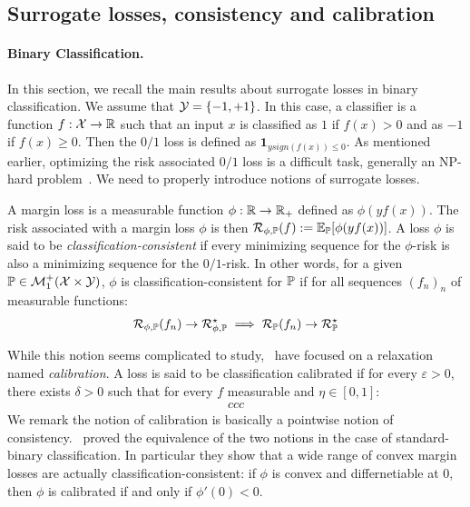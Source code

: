 \subsection{Surrogate losses, consistency and calibration} 

\paragraph{Binary Classification.} In this section, we recall the main results about surrogate losses in binary classification. We assume that $\mathcal{Y} = \{-1,+1\}$. In this case, a classifier is a function $f:\mathcal{X}\to\mathbb{R}$ such that an input $x$ is classified as $1$ if $f(x)>0$ and as $-1$ if $f(x)\geq 0$. Then the $0/1$ loss is defined as $\mathbf{1}_{ysign(f(x))\leq0}$. As mentioned earlier, optimizing the risk associated $0/1$ loss is a difficult task, generally an NP-hard problem~\cite{xxx}. We need to properly introduce notions of surrogate losses. 

A margin loss is a measurable function $\phi:\mathbb{R}\to\mathbb{R}_+$ defined as $\phi(yf(x))$. The risk associated with a margin loss $\phi$ is then $\risk_{\phi,\PP}(f):=\mathbb{E}_\PP\left[\phi(yf(x))\right]$. A loss $\phi$ is said to be \emph{classification-consistent} if every minimizing sequence for the $\phi$-risk is also a minimizing sequence for the $0/1$-risk. In other words, for a given $\mathbb{P}\in\mathcal{M}_1^+(\mathcal{X}\times\mathcal{Y})$, $\phi$ is classification-consistent for $\mathbb{P}$ if for all sequences $(f_n)_n$ of measurable functions:
\begin{align}
    \mathcal{R}_{\phi,\mathbb{P}}(f_n)\to \mathcal{R}_{\phi,\mathbb{P}}^\star\implies\mathcal{R}_{\mathbb{P}}(f_n)\to \mathcal{R}_{\mathbb{P}}^\star
\end{align}

 While this notion seems complicated to study,~\cite{bartlett2006convexity,steinwart2007compare} have focused on a relaxation named \emph{calibration}. A loss is said to be classification calibrated if for every $\varepsilon>0$, there exists $\delta>0$ such that for every $f$ measurable and $\eta\in[0,1]$:
\begin{align*}
    ccc
\end{align*}
We remark the notion of calibration is basically a pointwise notion of consistency.~\cite{bartlett2006convexity,steinwart2007compare} proved the equivalence of the two notions in the case of standard-binary classification. In particular they show that a wide range of convex margin losses are actually classification-consistent: if $\phi$ is convex and differnetiable at $0$, then $\phi$ is calibrated if and only if $\phi'(0)<0$.





